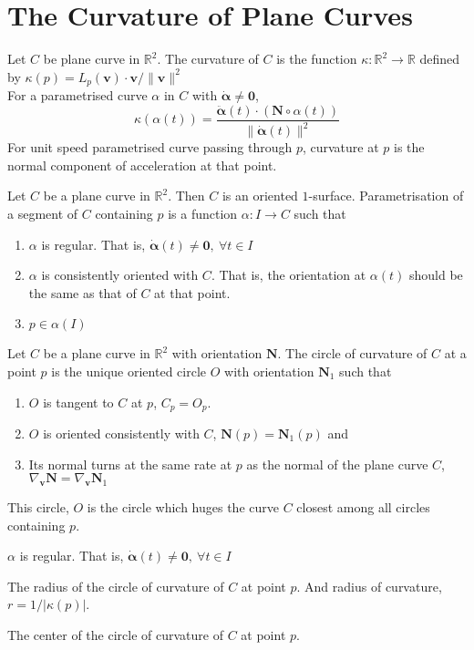 \section{The Curvature of Plane Curves}
\begin{description}
	\item[curvature] Let $C$ be plane curve in $\mathbb{R}^2$.
		The curvature of $C$ is the function $\kappa : \mathbb{R}^2 \to \mathbb{R}$ defined by $\kappa(p) = L_p(\boldsymbol{v}) \cdot \boldsymbol{v} /\|\boldsymbol{v}\|^2$\\

	For a parametrised curve $\alpha$ in $C$ with $\dot{\boldsymbol{\alpha}} \ne \boldsymbol{0}$,
		\[ \kappa(\alpha(t)) = \frac{\ddot{\boldsymbol{\alpha}}(t) \cdot (\boldsymbol{N} \circ \alpha(t))}{\| \dot{\boldsymbol{\alpha}}(t)\|^2} \]
		For unit speed parametrised curve passing through $p$, curvature at $p$ is the normal component of acceleration at that point.
	\item[local parametrisation of plane curve] Let $C$ be a plane curve in $\mathbb{R}^2$.
		Then $C$ is an oriented $1$-surface.
		Parametrisation of a segment of $C$ containing $p$ is a function $\alpha : I \to C$ such that
	\begin{enumerate}
		\item $\alpha$ is regular.
			That is, $\dot{\boldsymbol{\alpha}}(t) \ne \boldsymbol{0},\ \forall t \in I$
		\item $\alpha$ is consistently oriented with $C$.
			That is, the orientation at $\alpha(t)$ should be the same as that of $C$ at that point.
		\item $p \in \alpha(I)$
	\end{enumerate}
\item[circle of curvature] Let $C$ be a plane curve in $\mathbb{R}^2$ with orientation $\boldsymbol{N}$.
	The circle of curvature of $C$ at a point $p$ is the unique oriented circle $O$ with orientation $\boldsymbol{N}_1$ such that
	\begin{enumerate}
		\item $O$ is tangent to $C$ at $p$, $C_p = O_p$.
		\item $O$ is oriented consistently with $C$, $\boldsymbol{N}(p) = \boldsymbol{N}_1(p)$ and
		\item Its normal turns at the same rate at $p$ as the normal of the plane curve $C$, $\nabla_{\boldsymbol{v}} \boldsymbol{N} = \nabla_{\boldsymbol{v}} \boldsymbol{N}_1$
	\end{enumerate}
		This circle, $O$ is the circle which huges the curve $C$ closest among all circles containing $p$.
		\item $\alpha$ is regular.
			That is, $\dot{\boldsymbol{\alpha}}(t) \ne \boldsymbol{0},\ \forall t \in I$
		\item[radius of curvature] The radius of the circle of curvature of $C$ at point $p$.
			And radius of curvature, $r = 1/|\kappa(p)|$.
	\item[center of curvature] The center of the circle of curvature of $C$ at point $p$.
\end{description}

